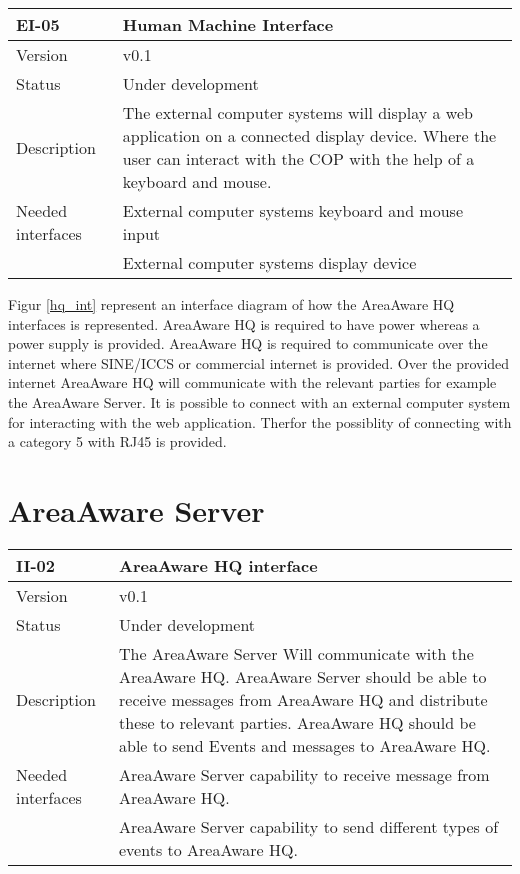 \begin{longtable}{| p{3.5cm} |  p{10cm} | }
	\hline
	\textbf{EI-05} &  \textbf{Human Machine Interface} \\
	\hline
	Version & v0.1 \\
	\hline
	Status & Under development \\
	\hline
	Description & The external computer systems will display a web application on a connected display device. Where the user can interact with the COP with the help of a keyboard and mouse.
	\\
	\hline
	Needed interfaces 
	& External computer systems keyboard and mouse input \\
	& External computer systems display device \\ 
	\hline
\end{longtable}
\clearpage
{} 

Figur \ref{hq_int} represent an interface diagram of how the AreaAware HQ interfaces is represented. AreaAware HQ is required to have power whereas a power supply is provided. AreaAware HQ is required to communicate over the internet where SINE/ICCS or commercial internet is provided. Over the provided internet AreaAware HQ will communicate with the relevant parties for example the AreaAware Server. It is possible to connect with an external computer system for interacting with the web application. Therfor the possiblity of connecting with a category 5 with RJ45 is provided. 


\newpage

\section{AreaAware Server}
\label{sec:areaAwareserver}
\begin{longtable}{| p{3.5cm} |  p{10cm} | }
	\hline
	\textbf{II-02} &  \textbf{AreaAware HQ interface } \\
	\hline
	Version & v0.1 \\
	\hline
	Status & Under development \\
	\hline
	Description & The AreaAware Server Will communicate with the AreaAware HQ. AreaAware Server should be able to receive messages from AreaAware HQ and distribute these to relevant parties. AreaAware HQ should be able to send Events and messages to AreaAware HQ.\\
	\hline
	Needed interfaces & AreaAware Server capability to receive message from AreaAware HQ.\\
	& AreaAware Server capability to send different types of events to AreaAware HQ.\\
	\hline
\end{longtable}

